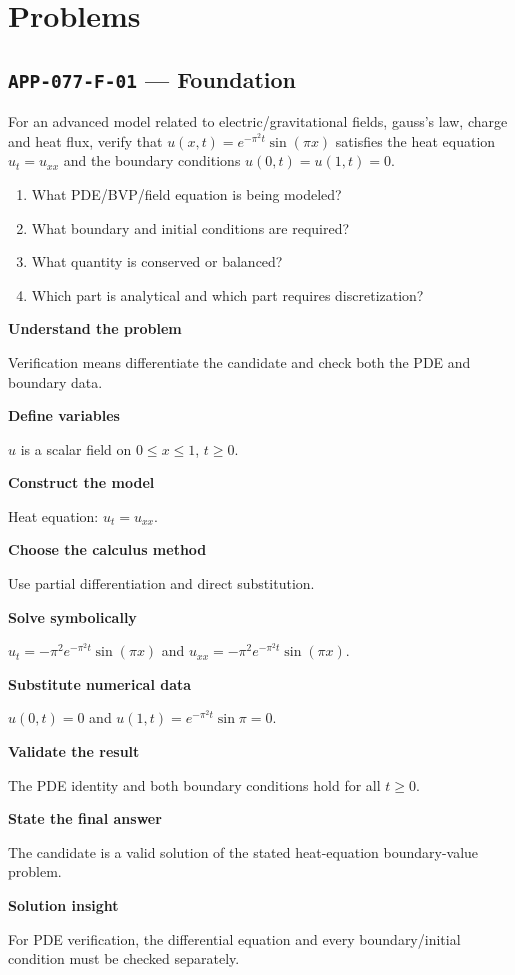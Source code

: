 \documentclass[11pt]{book}
\newcommand{\pid}[1]{\texttt{#1}}
\begin{document}
\section*{Problems}
\subsection*{\pid{APP-077-F-01} — Foundation}
\begin{problembox}
For an advanced model related to electric/gravitational fields, gauss's law, charge and heat flux, verify that $u(x,t)=e^{-\pi^2t}\sin(\pi x)$ satisfies the heat equation $u_t=u_{xx}$ and the boundary conditions $u(0,t)=u(1,t)=0$.
\end{problembox}
\begin{promptbox}\begin{enumerate}
\item What PDE/BVP/field equation is being modeled?
\item What boundary and initial conditions are required?
\item What quantity is conserved or balanced?
\item Which part is analytical and which part requires discretization?
\end{enumerate}\end{promptbox}
\begin{solutionbox}
\textbf{Understand the problem}\par Verification means differentiate the candidate and check both the PDE and boundary data.\par\medskip
\textbf{Define variables}\par $u$ is a scalar field on $0\le x\le1$, $t\ge0$.\par\medskip
\textbf{Construct the model}\par Heat equation: $u_t=u_{xx}$.\par\medskip
\textbf{Choose the calculus method}\par Use partial differentiation and direct substitution.\par\medskip
\textbf{Solve symbolically}\par $u_t=-\pi^2 e^{-\pi^2t}\sin(\pi x)$ and $u_{xx}=-\pi^2 e^{-\pi^2t}\sin(\pi x)$.\par\medskip
\textbf{Substitute numerical data}\par $u(0,t)=0$ and $u(1,t)=e^{-\pi^2t}\sin\pi=0$.\par\medskip
\textbf{Validate the result}\par The PDE identity and both boundary conditions hold for all $t\ge0$.\par\medskip
\textbf{State the final answer}\par The candidate is a valid solution of the stated heat-equation boundary-value problem.\par\medskip
\textbf{Solution insight}\par For PDE verification, the differential equation and every boundary/initial condition must be checked separately.\par\medskip
\end{solutionbox}
\end{document}
